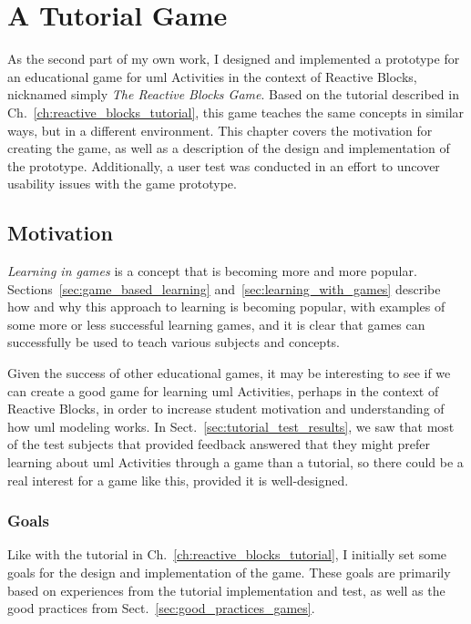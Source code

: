 \chapter{A Tutorial Game}
\label{ch:tutorial_game}
As the second part of my own work, I designed and implemented a prototype for an educational game for \gls{uml} Activities in the context of Reactive Blocks, nicknamed simply \emph{The Reactive Blocks Game}. Based on the tutorial described in Ch.~\ref{ch:reactive_blocks_tutorial}, this game teaches the same concepts in similar ways, but in a different environment. This chapter covers the motivation for creating the game, as well as a description of the design and implementation of the prototype. Additionally, a user test was conducted in an effort to uncover usability issues with the game prototype.

\section{Motivation}
\label{sec:game_motivation}
\emph{Learning in games} is a concept that is becoming more and more popular. Sections~\ref{sec:game_based_learning} and~\ref{sec:learning_with_games} describe how and why this approach to learning is becoming popular, with examples of some more or less successful learning games, and it is clear that games can successfully be used to teach various subjects and concepts.

\noindent
Given the success of other educational games, it may be interesting to see if we can create a good game for learning \gls{uml} Activities, perhaps in the context of Reactive Blocks, in order to increase student motivation and understanding of how \gls{uml} modeling works. In Sect.~\ref{sec:tutorial_test_results}, we saw that most of the test subjects that provided feedback answered that they might prefer learning about \gls{uml} Activities through a game than a tutorial, so there could be a real interest for a game like this, provided it is well-designed.

\subsection{Goals}
\label{sec:game_goals}
Like with the tutorial in Ch.~\ref{ch:reactive_blocks_tutorial}, I initially set some goals for the design and implementation of the game. These goals are primarily based on experiences from the tutorial implementation and test, as well as the good practices from Sect.~\ref{sec:good_practices_games}.

